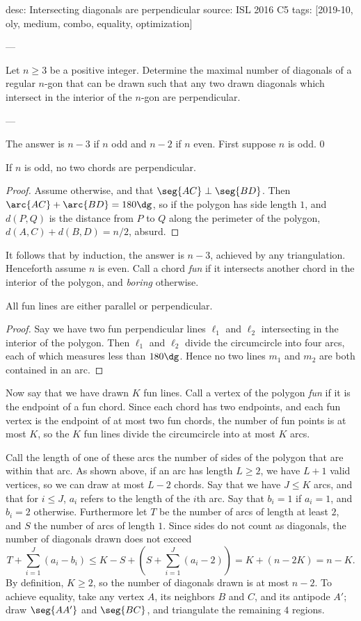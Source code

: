 desc: Intersecting diagonals are perpendicular
source: ISL 2016 C5
tags: [2019-10, oly, medium, combo, equality, optimization]

---

Let $n\ge3$ be a positive integer. Determine the maximal number of diagonals of a regular $n$-gon that can be drawn such that any two drawn diagonals which intersect in the interior of the $n$-gon are perpendicular.

---

The answer is $n-3$ if $n$ odd and $n-2$ if $n$ even. First suppose $n$ is odd.
\setcounter{iclaim}0
\begin{iclaim}
    If $n$ is odd, no two chords are perpendicular.
\end{iclaim}
\begin{proof}
    Assume otherwise, and that $\seg{AC}\perp\seg{BD}$. Then $\arc{AC}+\arc{BD}=180\dg$, so if the polygon has side length $1$, and $d(P,Q)$ is the distance from $P$ to $Q$ along the perimeter of the polygon, $d(A,C)+d(B,D)=n/2$, absurd.
\end{proof}

It follows that by induction, the answer is $n-3$, achieved by any triangulation. Henceforth assume $n$ is even. Call a chord \emph{fun} if it intersects another chord in the interior of the polygon, and \emph{boring} otherwise.
\begin{iclaim}
    All fun lines are either parallel or perpendicular.
\end{iclaim}
\begin{proof}
    Say we have two fun perpendicular lines $\ell_1$ and $\ell_2$ intersecting in the interior of the polygon. Then $\ell_1$ and $\ell_2$ divide the circumcircle into four arcs, each of which measures less than $180\dg$. Hence no two lines $m_1$ and $m_2$ are both contained in an arc.
\end{proof}

Now say that we have drawn $K$ fun lines. Call a vertex of the polygon \emph{fun} if it is the endpoint of a fun chord. Since each chord has two endpoints, and each fun vertex is the endpoint of at most two fun chords, the number of fun points is at most $K$, so the $K$ fun lines divide the circumcircle into at most $K$ arcs.

Call the length of one of these arcs the number of sides of the polygon that are within that arc. As shown above, if an arc has length $L\ge2$, we have $L+1$ valid vertices, so we can draw at most $L-2$ chords. Say that we have $J\le K$ arcs, and that for $i\le J$, $a_i$ refers to the length of the $i$th arc. Say that $b_i=1$ if $a_i=1$, and $b_i=2$ otherwise. Furthermore let $T$ be the number of arcs of length at least $2$, and $S$ the number of arcs of length $1$. Since sides do not count as diagonals, the number of diagonals drawn does not exceed \[T+\sum_{i=1}^J(a_i-b_i)\le K-S+\left(S+\sum_{i=1}^J(a_i-2)\right)=K+(n-2K)=n-K.\]
By definition, $K\ge2$, so the number of diagonals drawn is at most $n-2$. To achieve equality, take any vertex $A$, its neighbors $B$ and $C$, and its antipode $A'$; draw $\seg{AA'}$ and $\seg{BC}$, and triangulate the remaining $4$ regions.

